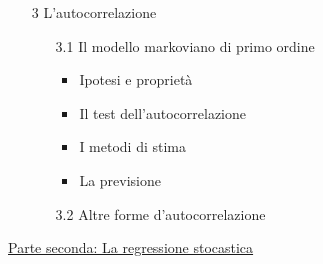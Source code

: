 \documentclass[a4paper,12pt]{article}
\begin{document}
\begin{enumerate}
\item[3] L'autocorrelazione

\begin{enumerate}
\item[3.1] Il modello markoviano di primo ordine

\begin{itemize}
\item Ipotesi e propriet\`{a}

\item Il test dell'autocorrelazione

\item I metodi di stima

\item La previsione
\end{itemize}

\item[3.2] Altre forme d'autocorrelazione
\end{enumerate}
\end{enumerate}

\bigskip

\underline{Parte seconda: La regressione stocastica}
\end{document}
